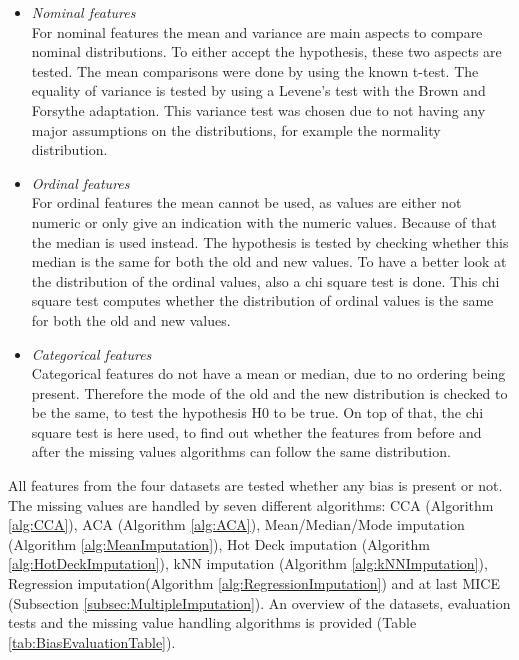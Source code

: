 \documentclass[10pt,a4paper]{article}
\begin{document}
	\begin{itemize}
		\item \textit{Nominal features} \\
		For nominal features the mean and variance are main aspects to compare nominal distributions. To either accept the hypothesis, these two aspects are tested. The mean comparisons were done by using the known t-test\cite{heiberger2004statistical}. The equality of variance is tested by using a Levene's test with the Brown and Forsythe adaptation. This variance test was chosen due to not having any major assumptions on the distributions, for example the normality distribution\cite{brown1974robust}.
		\item \textit{Ordinal features} \\
		For ordinal features the mean cannot be used, as values are either not numeric or only give an indication with the numeric values. Because of that the median is used instead. The hypothesis is tested by checking whether this median is the same for both the old and new values. To have a better look at the distribution of the ordinal values, also a chi square test is done. This chi square test computes whether the distribution of ordinal values is the same for both the old and new values\cite{satorra2001scaled}.
		\item \textit{Categorical features} \\
		Categorical features do not have a mean or median, due to no ordering being present. Therefore the mode of the old and the new distribution is checked to be the same, to test the hypothesis H0 to be true. On top of that, the chi square test is here used, to find out whether the features from before and after the missing values algorithms can follow the same distribution\cite{satorra2001scaled}.
	\end{itemize}
	
	All features from the four datasets are tested whether any bias is present or not. The missing values are handled by seven different algorithms: CCA (Algorithm \ref{alg:CCA}), ACA (Algorithm \ref{alg:ACA}), Mean/Median/Mode imputation (Algorithm \ref{alg:MeanImputation}), Hot Deck imputation (Algorithm \ref{alg:HotDeckImputation}), kNN imputation (Algorithm \ref{alg:kNNImputation}), Regression imputation(Algorithm \ref{alg:RegressionImputation}) and at last MICE (Subsection \ref{subsec:MultipleImputation}). An overview of the datasets, evaluation tests and the missing value handling algorithms is provided (Table \ref{tab:BiasEvaluationTable}).
	
\end{document}
